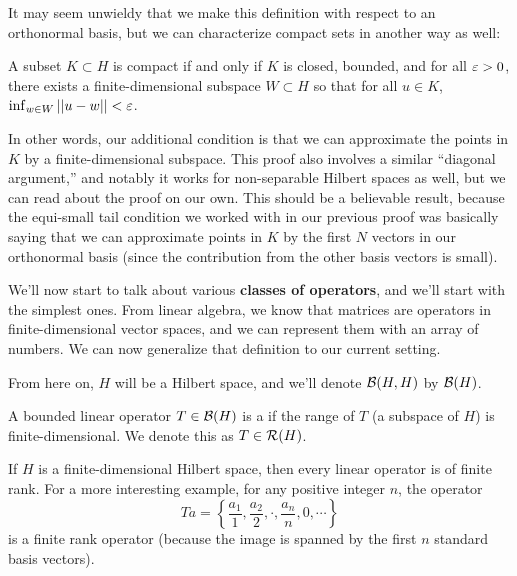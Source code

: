 It may seem unwieldy that we make this definition with respect to an orthonormal basis, but we can characterize compact sets in another way as well:

\begin{theorem}
A subset $K \subset H$ is compact if and only if $K$ is closed, bounded, and for all $\varepsilon > 0$, there exists a finite-dimensional subspace $W \subset H$ so that for all $u \in K$, $\inf_{w \in W} ||u - w|| < \varepsilon$.
\end{theorem}

In other words, our additional condition is that we can approximate the points in $K$ by a finite-dimensional subspace. This proof also involves a similar ``diagonal argument,'' and notably it works for non-separable Hilbert spaces as well, but we can read about the proof on our own. This should be a believable result, because the equi-small tail condition we worked with in our previous proof was basically saying that we can approximate points in $K$ by the first $N$ vectors in our orthonormal basis (since the contribution from the other basis vectors is small).

We'll now start to talk about various \textbf{classes of operators}, and we'll start with the simplest ones. From linear algebra, we know that matrices are operators in finite-dimensional vector spaces, and we can represent them with an array of numbers. We can now generalize that definition to our current setting.

\begin{fact}
From here on, $H$ will be a Hilbert space, and we'll denote $\mathcal{B}(H, H)$ by $\mathcal{B}(H)$. 
\end{fact}

\begin{definition}
A bounded linear operator $T \in \mathcal{B}(H)$ is a  if the range of $T$ (a subspace of $H$) is finite-dimensional. We denote this as $T \in \mathcal{R}(H)$.
\end{definition}

\begin{example}
If $H$ is a finite-dimensional Hilbert space, then every linear operator is of finite rank. For a more interesting example, for any positive integer $n$, the operator
\[
    Ta = \left\{\frac{a_1}{1}, \frac{a_2}{2}, \cdot, \frac{a_n}{n}, 0, \cdots\right\}
\]  
is a finite rank operator (because the image is spanned by the first $n$ standard basis vectors). 
\end{example}

